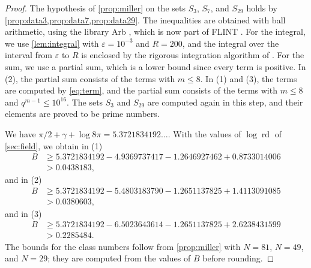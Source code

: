 \documentclass[11pt]{amsart}
\theoremstyle{plain}
\theoremstyle{definition}
\begin{document}
\begin{proof}
The hypothesis of \cref{prop:miller} on the sets $S_3$, $S_7$, and $S_{29}$ holds by \cref{prop:data3,prop:data7,prop:data29}.
The inequalities are obtained with ball arithmetic, using the library Arb \cite{Jo17}, which is now part of FLINT \cite{FLINT}.
For the integral, we use \cref{lem:integral} with $\varepsilon = 10^{-3}$ and $R = 200$, and the integral over the interval from $\varepsilon$ to $R$ is enclosed by the rigorous integration algorithm of \cite{Jo18}.
For the sum, we use a partial sum, which is a lower bound since every term is positive.
In (2), the partial sum consists of the terms with $m \le 8$.
In (1) and (3), the terms are computed by \eqref{eq:term}, and the partial sum consists of the terms with $m \le 8$ and $q^{m-1} \le 10^{16}$.
The sets $S_3$ and $S_{29}$ are computed again in this step, and their elements are proved to be prime numbers.

We have $\pi/2 + \gamma + \log 8\pi = 5.3721834192\ldots$.
With the values of $\log \operatorname{rd}$ of \cref{sec:field}, we obtain in (1)
\begin{align*}
B &\ge 5.3721834192 - 4.9369737417 - 1.2646927462 + 0.8733014006 \\
&> 0.0438183,
\end{align*}
and in (2)
\begin{align*}
B &\ge 5.3721834192 - 5.4803183790 - 1.2651137825 + 1.4113091085 \\
&> 0.0380603,
\end{align*}
and in (3)
\begin{align*}
B &\ge 5.3721834192 - 6.5023643614 - 1.2651137825 + 2.6238431599 \\
&> 0.2285484 .
\end{align*}
The bounds for the class numbers follow from \cref{prop:miller} with $N = 81$, $N = 49$, and $N = 29$; they are computed from the values of $B$ before rounding.
\end{proof}
\end{document}
